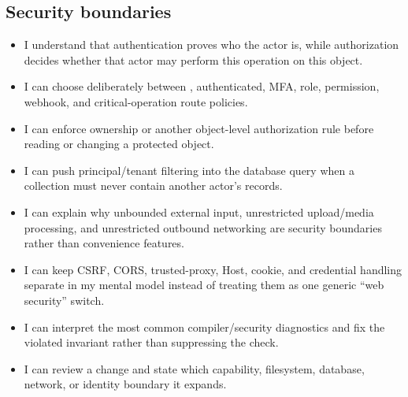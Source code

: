 \subsection*{Security boundaries}
\begin{itemize}[label={\texttt{[ ]}},leftmargin=2em]
  \item I understand that authentication proves who the actor is, while authorization decides whether that actor may perform this operation on this object.
  \item I can choose deliberately between , authenticated, MFA, role, permission, webhook, and critical-operation route policies.
  \item I can enforce ownership or another object-level authorization rule before reading or changing a protected object.
  \item I can push principal/tenant filtering into the database query when a collection must never contain another actor's records.
  \item I can explain why unbounded external input, unrestricted upload/media processing, and unrestricted outbound networking are security boundaries rather than convenience features.
  \item I can keep CSRF, CORS, trusted-proxy, Host, cookie, and credential handling separate in my mental model instead of treating them as one generic ``web security'' switch.
  \item I can interpret the most common compiler/security diagnostics and fix the violated invariant rather than suppressing the check.
  \item I can review a change and state which capability, filesystem, database, network, or identity boundary it expands.
\end{itemize}


